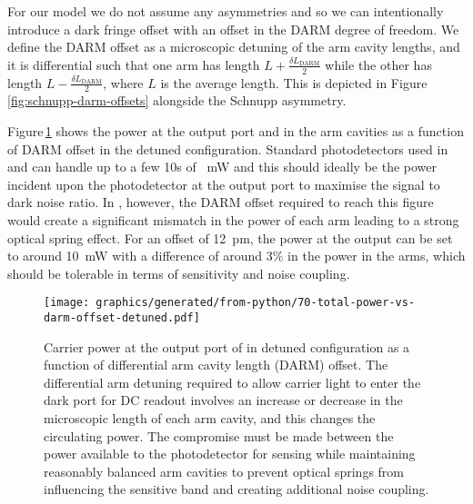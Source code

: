 For our model we do not assume any asymmetries and so we can intentionally introduce a dark fringe offset with an offset in the \gls{DARM} degree of freedom. We define the \gls{DARM} offset as a microscopic detuning of the arm cavity lengths, and it is differential such that one arm has length $L + \frac{\delta L_{\text{DARM}}}{2}$ while the other has length $L - \frac{\delta L_{\text{DARM}}}{2}$, where $L$ is the average length. This is depicted in Figure\,\ref{fig:schnupp-darm-offsets} alongside the Schnupp asymmetry.

Figure\,\ref{fig:total-power-vs-darm-offset-detuned} shows the power at the output port and in the arm cavities as a function of \gls{DARM} offset in the detuned configuration. Standard photodetectors used in \ALIGO{} and \AVIRGO{} can handle up to a few \num{10}s of \SI{}{\milli\watt} and this should ideally be the power incident upon the photodetector at the output port to maximise the signal to dark noise ratio. In \ETLF{}, however, the \gls{DARM} offset required to reach this figure would create a significant mismatch in the power of each arm leading to a strong optical spring effect. For an offset of \SI{12}{\pico\meter}, the power at the output can be set to around \SI{10}{\milli\watt} with a difference of around 3\% in the power in the arms, which should be tolerable in terms of sensitivity and noise coupling.

\begin{figure}
  \centering
  \texttt{[image: graphics/generated/from-python/70-total-power-vs-darm-offset-detuned.pdf]}
  \caption[Carrier power at the output port of \ETLF{} in detuned configuration as a function of differential arm cavity offset]{\label{fig:total-power-vs-darm-offset-detuned}Carrier power at the output port of \ETLF{} in detuned configuration as a function of differential arm cavity length (\gls{DARM}) offset. The differential arm detuning required to allow carrier light to enter the dark port for \gls{DC} readout involves an increase or decrease in the microscopic length of each arm cavity, and this changes the circulating power. The compromise must be made between the power available to the photodetector for sensing while maintaining reasonably balanced arm cavities to prevent optical springs from influencing the sensitive band and creating additional noise coupling.}
\end{figure}

